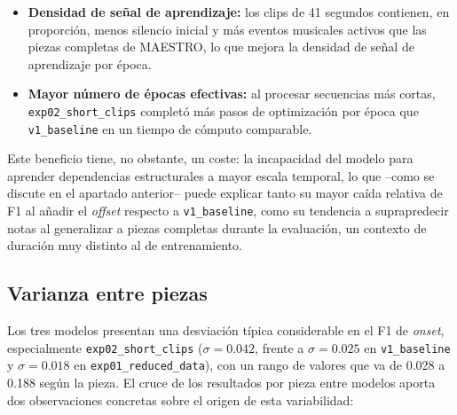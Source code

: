 \begin{itemize}
    \item \textbf{Densidad de señal de aprendizaje:} los clips de
    41 segundos contienen, en proporción, menos silencio inicial y
    más eventos musicales activos que las piezas completas de
    MAESTRO, lo que mejora la densidad de señal de aprendizaje por
    época.
    \item \textbf{Mayor número de épocas efectivas:} al procesar
    secuencias más cortas, \newline\texttt{exp02\_short\_clips} completó más
    pasos de optimización por época que \texttt{v1\_baseline} en un
    tiempo de cómputo comparable.
\end{itemize}

Este beneficio tiene, no obstante, un coste: la incapacidad del
modelo para aprender dependencias estructurales a mayor escala
temporal, lo que --como se discute en el apartado anterior-- puede
explicar tanto su mayor caída relativa de F1 al añadir el
\textit{offset} respecto a \texttt{v1\_baseline}, como su tendencia a
suprapredecir notas al generalizar a piezas completas durante la
evaluación, un contexto de duración muy distinto al de entrenamiento.

\subsection{Varianza entre piezas}

Los tres modelos presentan una desviación típica considerable en el
F1 de \textit{onset}, especialmente \texttt{exp02\_short\_clips}
($\sigma = 0.042$, frente a $\sigma = 0.025$ en
\texttt{v1\_baseline} y $\sigma = 0.018$ en
\texttt{exp01\_reduced\_data}), con un rango de valores que va de
0.028 a 0.188 según la pieza. El cruce de los resultados por pieza
entre modelos aporta dos observaciones concretas sobre el origen de
esta variabilidad:

